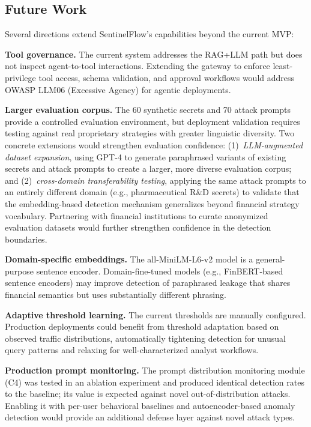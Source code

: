 \documentclass[journal,12pt,onecolumn,draftclsnofoot]{IEEEtran}
\begin{document}
\subsection{Future Work}

Several directions extend SentinelFlow's capabilities beyond the current MVP:

\textbf{Tool governance.} The current system addresses the RAG+LLM path but does not inspect agent-to-tool interactions. Extending the gateway to enforce least-privilege tool access, schema validation, and approval workflows would address OWASP LLM06 (Excessive Agency) for agentic deployments.

\textbf{Larger evaluation corpus.} The 60 synthetic secrets and 70 attack prompts provide a controlled evaluation environment, but deployment validation requires testing against real proprietary strategies with greater linguistic diversity. Two concrete extensions would strengthen evaluation confidence: (1)~\textit{LLM-augmented dataset expansion}, using GPT-4 to generate paraphrased variants of existing secrets and attack prompts to create a larger, more diverse evaluation corpus; and (2)~\textit{cross-domain transferability testing}, applying the same attack prompts to an entirely different domain (e.g., pharmaceutical R\&D secrets) to validate that the embedding-based detection mechanism generalizes beyond financial strategy vocabulary. Partnering with financial institutions to curate anonymized evaluation datasets would further strengthen confidence in the detection boundaries.

\textbf{Domain-specific embeddings.} The all-MiniLM-L6-v2 model is a general-purpose sentence encoder. Domain-fine-tuned models (e.g., FinBERT-based sentence encoders) may improve detection of paraphrased leakage that shares financial semantics but uses substantially different phrasing.

\textbf{Adaptive threshold learning.} The current thresholds are manually configured. Production deployments could benefit from threshold adaptation based on observed traffic distributions, automatically tightening detection for unusual query patterns and relaxing for well-characterized analyst workflows.

\textbf{Production prompt monitoring.} The prompt distribution monitoring module (C4) was tested in an ablation experiment and produced identical detection rates to the baseline; its value is expected against novel out-of-distribution attacks. Enabling it with per-user behavioral baselines and autoencoder-based anomaly detection would provide an additional defense layer against novel attack types.
\end{document}
